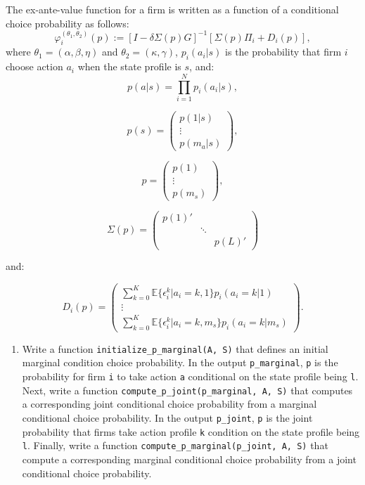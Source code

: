 \documentclass[
]{book}
\providecommand{\tightlist}{%
  \setlength{\itemsep}{0pt}\setlength{\parskip}{0pt}}
\begin{document}
The ex-ante-value function for a firm is written as a function of a conditional choice probability as follows:
\[
\varphi_i^{(\theta_1, \theta_2)}(p) := [I - \delta \Sigma(p) G]^{-1}[\Sigma(p)\Pi_i + D_i(p)],
\]
where \(\theta_1 = (\alpha, \beta, \eta)\) and \(\theta_2 = (\kappa, \gamma)\), \(p_i(a_i|s)\) is the probability that firm \(i\) choose action \(a_i\) when the state profile is \(s\), and:
\[
p(a|s) = \prod_{i = 1}^N p_i(a_i|s), 
\]

\[
p(s) = 
\begin{pmatrix}
p(1|s) \\
\vdots \\
p(m_a|s)
\end{pmatrix},
\]

\[
p = 
\begin{pmatrix}
p(1)\\
\vdots\\
p(m_s)
\end{pmatrix},
\]

\[
\Sigma(p) =
\begin{pmatrix}
p(1)' & & \\
 & \ddots & \\
 & & p(L)'
\end{pmatrix}
\]

and:

\[
D_i(p) =
\begin{pmatrix}
\sum_{k = 0}^K \mathbb{E}\{\epsilon_i^k|a_i = k, 1\}p_i(a_i = k|1)\\
\vdots\\
\sum_{k = 0}^K \mathbb{E}\{\epsilon_i^k|a_i = k, m_s\}p_i(a_i = k|m_s)
\end{pmatrix}.
\]

\begin{enumerate}
\def\labelenumi{\arabic{enumi}.}
\setcounter{enumi}{4}
\tightlist
\item
  Write a function \texttt{initialize\_p\_marginal(A,\ S)} that defines an initial marginal condition choice probability. In the output \texttt{p\_marginal}, \texttt{p} is the probability for firm \texttt{i} to take action \texttt{a} conditional on the state profile being \texttt{l}. Next, write a function \texttt{compute\_p\_joint(p\_marginal,\ A,\ S)} that computes a corresponding joint conditional choice probability from a marginal conditional choice probability. In the output \texttt{p\_joint}, \texttt{p} is the joint probability that firms take action profile \texttt{k} condition on the state profile being \texttt{l}. Finally, write a function \texttt{compute\_p\_marginal(p\_joint,\ A,\ S)} that compute a corresponding marginal conditional choice probability from a joint conditional choice probability.
\end{enumerate}
\end{document}
